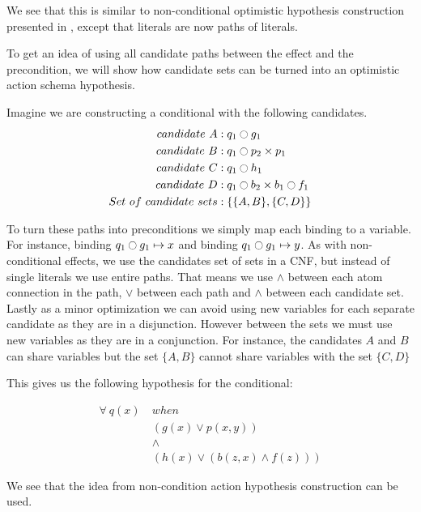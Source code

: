 \documentclass[\master/Master.tex]{subfiles}
\begin{document}
  	We see that this is similar to non-conditional optimistic hypothesis construction presented in , except that literals are now paths of literals.
  	
  	\begin{example}\label{ex:ca:opt-hyp-cons} To get an idea of using all candidate paths between the effect and the precondition, 
  		we will show how candidate sets can be turned into an optimistic action schema hypothesis.
  		
  		Imagine we are constructing a conditional with the following candidates.
  		\begin{align*}
  				candidate~ A &: q_1 \ocircle g_1  \\
  				candidate~ B &: q_1 \ocircle p_2 \times p_1  	\\			
  				candidate~ C &: q_1 \ocircle h_1 \\
  				candidate~ D &: q_1 \ocircle b_2 \times b_1 \ocircle  f_1\\
  				Set ~of ~candidate ~sets &: \left\{ \{ A, B \}, \{ C, D \}  \right\}
  		\end{align*}
  		
  		To turn these paths into preconditions we simply map each binding to a variable. 
  		For instance, binding $q_1 \ocircle g_1 \mapsto x$ and binding $q_1 \ocircle g_1 \mapsto y$.   		
  		As with non-conditional effects, we use the candidates set of sets in a CNF, but instead of single literals we use entire paths.
  		That means we use $\land$ between each atom connection in the path, $\lor$ between each path and $\land$ between each candidate set.	
  		Lastly as a minor optimization we can avoid using new variables for each separate candidate as they are in a disjunction.
  		However between the sets we must use new variables as they are in a conjunction.
  		For instance, the candidates $A$ and $B$ can share variables but the set $\{A, B\}$ cannot share variables with  the set $\{C, D\}$
  		
  		This gives us the following hypothesis for the conditional:
  		
  			\begin{align*}	
  				\forall ~q(x)~ & when ~ \\
   				&\left( g(x) \lor p(x,y) \right) \\
  				&\land \\
  				&\left( h(x) \lor \left( b(z,x) \land f(z)  \right) \right)
  			\end{align*}
  		
  		We see that the idea from non-condition action hypothesis construction can be used.
  		
  	\end{example}
  
\end{document}
